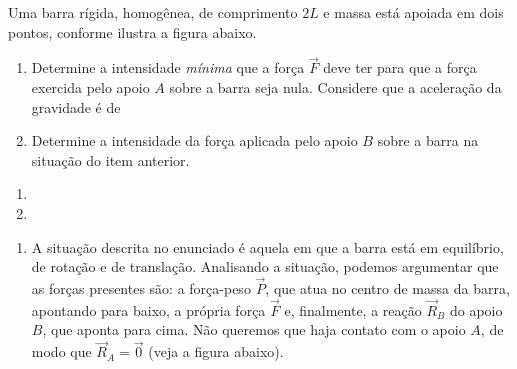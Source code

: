 \begin{question}
    Uma barra rígida, homogênea, de comprimento $2L$ e massa  está apoiada em dois pontos, conforme ilustra a figura abaixo.
    \begin{enumerate}
      \item Determine a intensidade \emph{mínima} que a força $\vec F$ deve ter para que a força exercida pelo apoio $A$ sobre a barra seja nula.
      Considere que a aceleração da gravidade é de 
      \item Determine a intensidade da força aplicada pelo apoio $B$ sobre a barra na situação do item anterior.
    \end{enumerate}


    \begin{answer}
      \begin{enumerate}
        \item {}
        \item {}
      \end{enumerate}
    \end{answer}

    \begin{solution}
      \begin{enumerate}
        \item A situação descrita no enunciado é aquela em que a barra está em equilíbrio, de rotação e de translação.
        Analisando a situação, podemos argumentar que as forças presentes são: a força-peso $\vec P$, que atua no centro de massa da barra, apontando para baixo, a própria força $\vec F$ e, finalmente, a reação $\vec R_B$ do apoio $B$, que aponta para cima.
        Não queremos que haja contato com o apoio $A$, de modo que $\vec R_A = \vec 0$ (veja a figura abaixo).



\end{enumerate}
\end{solution}
\end{question}
